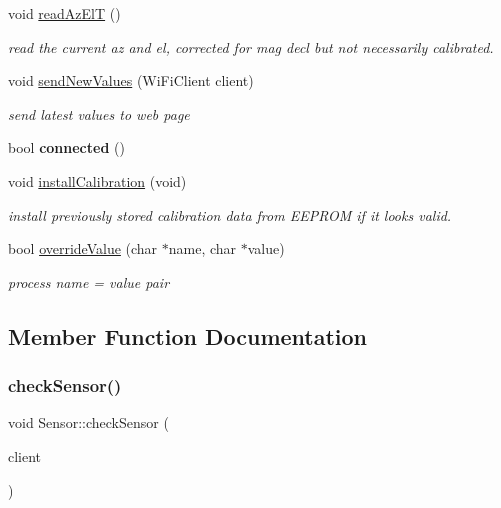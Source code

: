 \begin{DoxyCompactItemize}
void \hyperlink{class_sensor_afc67b7e3e26688fa9553c6ae6f07c04b}{read\+Az\+ElT} ()
\begin{DoxyCompactList}\small\item\em read the current az and el, corrected for mag decl but not necessarily calibrated. \end{DoxyCompactList}\item 
void \hyperlink{class_sensor_afd75951a11c5609b995e270e4c087948}{send\+New\+Values} (Wi\+Fi\+Client client)
\begin{DoxyCompactList}\small\item\em send latest values to web page \end{DoxyCompactList}\item 
\mbox{\label{class_sensor_a250d9c66e17d1c17cf9f9d8ced730ac4}} 
bool {\bfseries connected} ()
\item 
void \hyperlink{class_sensor_ac9a8e83f50e6051a14dae3eef24bdba2}{install\+Calibration} (void)
\begin{DoxyCompactList}\small\item\em install previously stored calibration data from E\+E\+P\+R\+OM if it looks valid. \end{DoxyCompactList}\item 
bool \hyperlink{class_sensor_af8ed43603baf0c0b6fb264241b6ee91f}{override\+Value} (char $\ast$name, char $\ast$value)
\begin{DoxyCompactList}\small\item\em process name = value pair \end{DoxyCompactList}\end{DoxyCompactItemize}


\subsection{Member Function Documentation}
\mbox{\label{class_sensor_a7deffa1efa1d54a560b6bf808e3fe9c8}} 
\subsubsection{\texorpdfstring{check\+Sensor()}{checkSensor()}}
{\footnotesize\ttfamily void Sensor\+::check\+Sensor (\begin{DoxyParamCaption}\item[{Wi\+Fi\+Client}]{client }\end{DoxyParamCaption})}



